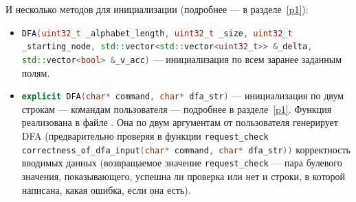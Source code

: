 \documentclass{article}
\begin{document}
И несколько методов для инициализации (подробнее --- в разделе~\ref{p1}):
\begin{itemize}
  \item[\ding{228}] \lstinline[language=C++]!DFA(uint32_t _alphabet_length, uint32_t _size, uint32_t _starting_node, std::vector<std::vector<uint32_t>> &_delta, std::vector<bool> &_v_acc)! --- инициализация по всем заранее заданным полям.
  \item[\ding{228}] \lstinline[language=C++]!explicit DFA(char* command, char* dfa_str)! --- инициализация по двум строкам --- командам пользователя --- подробнее в разделе~\ref{p1}. Функция реализована в файле . Она по двум аргументам от пользователя генерирует DFA (предварительно проверяя в функции \lstinline[language=C++]!request_check correctness_of_dfa_input(char* command, char* dfa_str))! корректность вводимых данных (возвращаемое значение \lstinline[language=C++]!request_check! --- пара булевого значения, показывающего, успешна ли проверка или нет и строки, в которой написана, какая ошибка, если она есть).
  \end{itemize}
\end{document}

